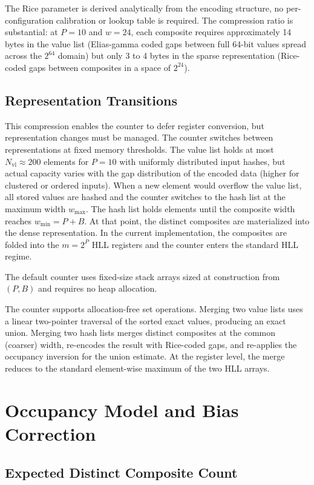 \documentclass[11pt,letterpaper]{article}
\begin{document}
The Rice parameter is derived analytically from the encoding structure,
no per-configuration calibration or lookup table is required. The
compression ratio is substantial: at $P = 10$ and $w = 24$, each
composite requires approximately 14 bytes in the value list (Elias-gamma
coded gaps between full 64-bit values spread across the $2^{64}$ domain)
but only 3 to 4 bytes in the sparse representation (Rice-coded gaps
between composites in a space of $2^{24}$).

\subsection{Representation Transitions}

This compression enables the counter to defer register conversion,
but representation changes must be managed. The counter switches
between representations at fixed memory thresholds. The value list holds at most $N_{\text{vl}} \approx 200$
elements for $P = 10$ with uniformly distributed input hashes, but
actual capacity varies with the gap distribution of the encoded data
(higher for clustered or ordered inputs). When a new element
would overflow the value list, all stored values are hashed and the
counter switches to the hash list at the maximum width
$w_{\max}$. The hash list holds elements until the composite
width reaches $w_{\min} = P + B$. At that point, the distinct composites are
materialized into the dense representation. In the current
implementation, the composites are folded into the $m = 2^P$
HLL registers and the counter enters the standard HLL
regime.

The default counter uses fixed-size stack arrays sized at construction
from $(P, B)$ and requires no heap allocation.

The counter supports allocation-free set operations. Merging two value
lists uses a linear two-pointer traversal of the sorted exact values,
producing an exact union. Merging two hash lists merges distinct
composites at the common (coarser) width, re-encodes the result with
Rice-coded gaps, and re-applies the occupancy inversion for the union
estimate. At the register level, the merge reduces to the standard
element-wise maximum of the two HLL arrays.


\section{Occupancy Model and Bias Correction}
\label{sec:occupancy}

\subsection{Expected Distinct Composite Count}
\end{document}
